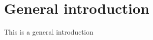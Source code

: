 \chapter*{General introduction}

\thispagestyle{empty}

This is a general introduction

\pagestyle{default}